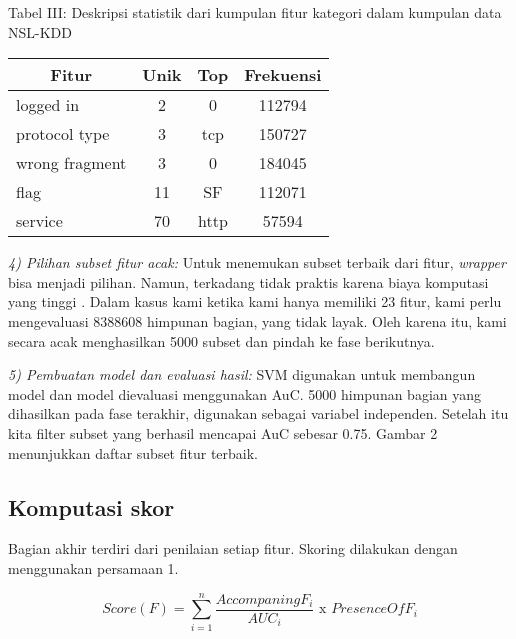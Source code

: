 \documentclass[conference]{IEEEtran}
\begin{document}
\begin{table}[htbp]
    Tabel III: Deskripsi statistik dari kumpulan fitur kategori dalam kumpulan data NSL-KDD
    \begin{center}
    \begin{tabular}{l|c|c|c}
    \hline
    \multicolumn{1}{c|}{\textbf{Fitur}}&\multicolumn{1}{c|}{\textbf{Unik}}&\multicolumn{1}{c|}{\textbf{Top}}&\multicolumn{1}{c}{\textbf{Frekuensi}} \\
    \hline
    logged in& 2& 0& 112794\\
    \hline
    protocol type& 3& tcp& 150727\\
    \hline
    wrong fragment& 3& 0& 184045\\
    \hline
    flag& 11& SF& 112071\\
    \hline
    service& 70& http& 57594\\
    \hline
    \end{tabular}
    \label{tab2}
    \end{center}
\end{table}

\emph{4) Pilihan subset fitur acak:} Untuk menemukan subset terbaik dari fitur, \emph{wrapper} bisa menjadi pilihan. Namun, terkadang tidak praktis karena biaya komputasi yang tinggi \cite{2015surveys}.
Dalam kasus kami ketika kami hanya memiliki 23 fitur, kami perlu mengevaluasi 8388608 himpunan bagian, yang tidak layak. Oleh karena itu, kami secara acak menghasilkan 5000 subset dan pindah ke fase berikutnya.

\emph{5) Pembuatan model dan evaluasi hasil:} SVM digunakan untuk membangun model dan model dievaluasi menggunakan AuC. 5000 himpunan bagian yang dihasilkan pada fase terakhir, digunakan sebagai variabel independen. Setelah itu kita filter subset yang berhasil mencapai AuC sebesar 0.75. Gambar 2 menunjukkan daftar subset fitur terbaik.

\subsection{Komputasi skor}

Bagian akhir terdiri dari penilaian setiap fitur. Skoring dilakukan dengan menggunakan persamaan 1.

\begin{equation}
    Score(F)=\sum^{n}_{i=1} \frac{Accompaning F_i} {AUC_i} \text{ x } PresenceOfF_i
    \label{eq}
\end{equation}\vspace{6px}
\end{document}
